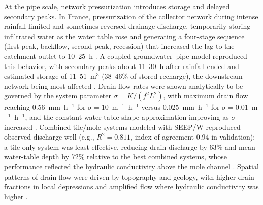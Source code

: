 At the pipe scale, network pressurization introduces storage and delayed secondary peaks. In France, pressurization of the collector network during intense rainfall limited and sometimes reversed drainage discharge, temporarily storing infiltrated water as the water table rose and generating a four-stage sequence (first peak, backflow, second peak, recession) that increased the lag to the catchment outlet to 10--25~h \parencite{Henine2010}. A coupled groundwater--pipe model reproduced this behavior, with secondary peaks about 11--30~h after rainfall ended and estimated storage of 11--51~m$^3$ (38--46\% of stored recharge), the downstream network being most affected \parencite{Henine2014}. Drain flow rates were shown analytically to be governed by the system parameter $\sigma = K/(f^2 L^2)$, with maximum drain flow reaching 0.56~mm~h$^{-1}$ for $\sigma=10$~m$^{-1}$~h$^{-1}$ versus 0.025~mm~h$^{-1}$ for $\sigma=0.01$~m$^{-1}$~h$^{-1}$, and the constant-water-table-shape approximation improving as $\sigma$ increased \parencite{Bouarfa2000}. Combined tile/mole systems modeled with SEEP/W reproduced observed discharge well (e.g., $R^2=0.811$, index of agreement 0.94 in validation); a tile-only system was least effective, reducing drain discharge by 63\% and mean water-table depth by 72\% relative to the best combined systems, whose performance reflected the hydraulic conductivity above the mole channel \parencite{Tuohy2018}. Spatial patterns of drain flow were driven by topography and geology, with higher drain fractions in local depressions and amplified flow where hydraulic conductivity was higher \parencite{Mahmood2023}.

